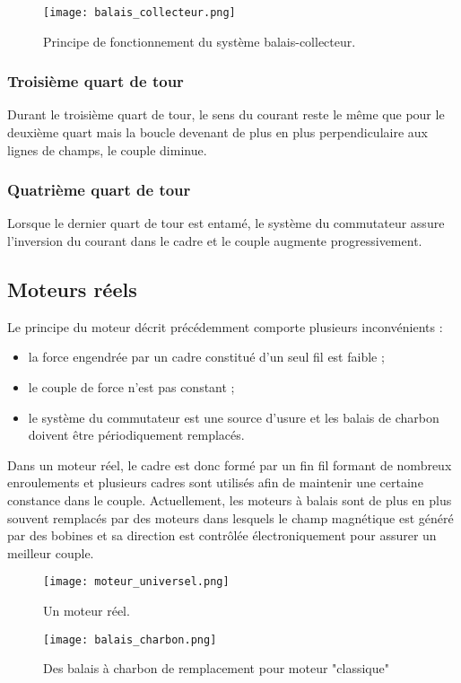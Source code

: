 \begin{figure}[h]
    \centering
    \texttt{[image: balais\_collecteur.png]}
    \caption{Principe de fonctionnement du système balais-collecteur.}
    \label{balais_collecteur}
\end{figure}

\subsubsection*{Troisième quart de tour}
Durant le troisième quart de tour, le sens du courant reste le même que pour le deuxième quart mais la boucle devenant de plus en plus perpendiculaire aux lignes de champs, le couple diminue.


\subsubsection*{Quatrième quart de tour}
Lorsque le dernier quart de tour est entamé, le système du commutateur assure l'inversion du courant dans le cadre et le couple augmente progressivement.

\subsection{Moteurs réels}
Le principe du moteur décrit précédemment comporte plusieurs inconvénients :
\begin{itemize}[label=\textbullet]
    \item la force engendrée par un cadre constitué d'un seul fil est faible ;
    \item le couple de force n'est pas constant ;
    \item le système du commutateur est une source d'usure et les balais de charbon doivent être périodiquement remplacés.
\end{itemize}

Dans un moteur réel, le cadre est donc formé par un fin fil formant de nombreux enroulements et plusieurs cadres sont utilisés afin de maintenir une certaine constance dans le couple.
Actuellement, les moteurs à balais sont de plus en plus souvent remplacés par des moteurs  dans lesquels le champ magnétique est généré par des bobines et sa direction est contrôlée électroniquement pour assurer un meilleur couple.

\newpage

\begin{figure}[!ht]
    \centering
    \begin{minipage}[b]{.47\linewidth}
        \centering
        \texttt{[image: moteur\_universel.png]}
        \caption{Un moteur réel.}
        \label{moteur_reel}
    \end{minipage}
    \begin{minipage}[b]{.47\linewidth}
        \centering
        \texttt{[image: balais\_charbon.png]}
        \caption{Des balais à charbon de remplacement pour moteur "classique"}
        \label{balais_charbon}
    \end{minipage}
\end{figure}


